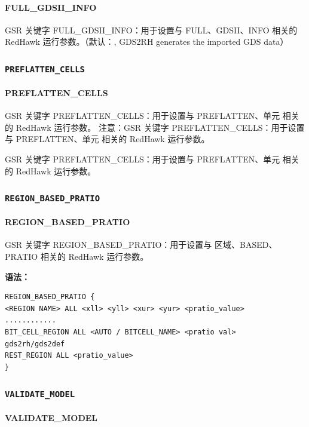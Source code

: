 \paragraph*{FULL_GDSII_INFO}

GSR 关键字 FULL_GDSII_INFO：用于设置与 FULL、GDSII、INFO 相关的 RedHawk 运行参数。（默认：, GDS2RH generates the imported GDS data）

\subsubsection{\texttt{PREFLATTEN_CELLS}}
\paragraph*{PREFLATTEN_CELLS}

GSR 关键字 PREFLATTEN_CELLS：用于设置与 PREFLATTEN、单元 相关的 RedHawk 运行参数。 注意：GSR 关键字 PREFLATTEN_CELLS：用于设置与 PREFLATTEN、单元 相关的 RedHawk 运行参数。

\begin{noteBox}
GSR 关键字 PREFLATTEN\_CELLS：用于设置与 PREFLATTEN、单元 相关的 RedHawk 运行参数。
\end{noteBox}

\subsubsection{\texttt{REGION_BASED_PRATIO}}
\paragraph*{REGION_BASED_PRATIO}

GSR 关键字 REGION_BASED_PRATIO：用于设置与 区域、BASED、PRATIO 相关的 RedHawk 运行参数。

\textbf{语法：}
\begin{lstlisting}
REGION_BASED_PRATIO {
<REGION NAME> ALL <xll> <yll> <xur> <yur> <pratio_value>
............
BIT_CELL_REGION ALL <AUTO / BITCELL_NAME> <pratio val>
gds2rh/gds2def
REST_REGION ALL <pratio_value>
}
\end{lstlisting}

\subsubsection{\texttt{VALIDATE_MODEL}}
\paragraph*{VALIDATE_MODEL}

